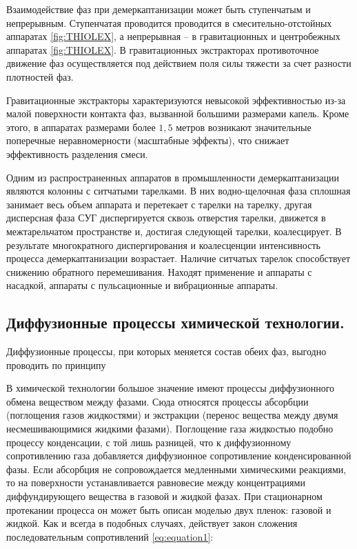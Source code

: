 Взаимодействие фаз при демеркаптанизации может быть ступенчатым и непрерывным. Ступенчатая проводится проводится в смесительно-отстойных аппаратах \cref{fig:THIOLEX}, а непрерывная – в гравитационных и центробежных аппаратах \cref{fig:THIOLEX}. В гравитационных экстракторах противоточное движение фаз осуществляется под действием поля силы тяжести за счет разности плотностей фаз.

Гравитационные экстракторы характеризуются невысокой эффективностью из-за малой поверхности контакта фаз, вызванной большими размерами капель. Кроме этого, в аппаратах размерами более $1,5$ метров возникают значительные поперечные неравномерности (масштабные эффекты), что снижает эффективность разделения смеси.

Одним из распространенных аппаратов в промышленности демеркаптанизации являются колонны с ситчатыми тарелками.  В них водно-щелочная фаза сплошная занимает весь объем аппарата и перетекает с тарелки на тарелку, другая дисперсная фаза СУГ диспергируется сквозь отверстия тарелки, движется в межтарельчатом пространстве и,  достигая следующей тарелки, коалесцирует. В результате многократного диспергирования и коалесценции интенсивность процесса демеркаптанизации возрастает. Наличие ситчатых тарелок способствует снижению обратного перемешивания. Находят применение и аппараты с насадкой, аппараты с пульсационные и вибрационные аппараты.
 
\subsection{Диффузионные процессы химической технологии.} \label{sec:ch1/sec4}

Диффузионные процессы, при которых меняется состав обеих фаз, выгодно проводить по принципу

В химической технологии большое значение имеют процессы диффузионного обмена веществом между фазами. Сюда относятся процессы абсорбции (поглощения газов жидкостями) и экстракции (перенос вещества между двумя несмешивающимися жидкими фазами). Поглощение газа жидкостью подобно процессу конденсации, с той лишь разницей, что к диффузионному сопротивлению газа добавляется диффузионное сопротивление конденсированной фазы. Если абсорбция не сопровождается медленными химическими реакциями, то на поверхности устанавливается равновесие между концентрациями диффундирующего вещества в газовой и жидкой фазах. При стационарном протекании процесса он может быть описан моделью двух пленок: газовой и жидкой. Как и всегда в подобных случаях, действует закон сложения последовательным сопротивлений \cref{eq:equation1}:
 
